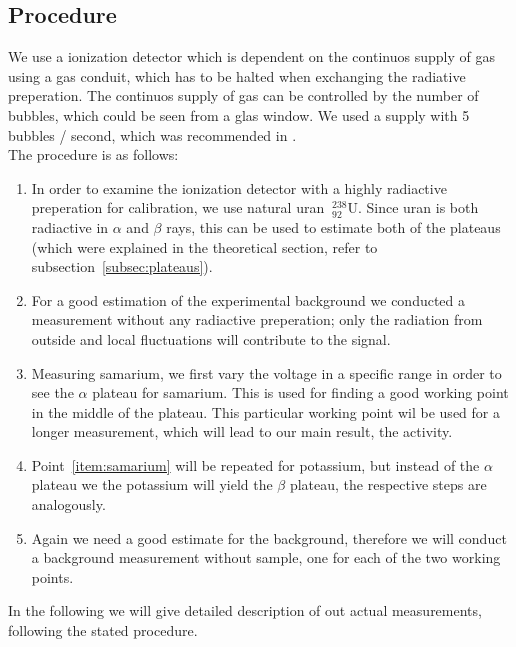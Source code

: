 \subsection{Procedure}
We use a ionization detector which is dependent on the continuos supply of 
gas using a gas conduit, which has to be halted when exchanging the radiative
preperation. The continuos supply of gas can be controlled by the number of
bubbles, which could be seen from a glas window. 
We used a supply with 5 bubbles / second, which was recommended in \cite{ver}.\\
The procedure is as follows:  
\begin{enumerate}
\item In order to examine the ionization detector with a highly radiactive 
preperation for calibration, we use natural uran $\mathrm{~^{238}_{92}U}$.
Since uran is both radiactive in $\alpha$ and $\beta$ rays, this can be used
to estimate both of the plateaus (which were explained in the theoretical section,
refer to subsection~\ref{subsec:plateaus}).
\item For a good estimation of the experimental background we conducted a measurement
without any radiactive preperation; only the radiation from outside and local fluctuations
will contribute to the signal.
\item Measuring samarium, we first vary the voltage in a specific range in order to 
see the $\alpha$ plateau for samarium. This is used for finding a good working point in the middle
of the plateau. This particular working point wil be used for a longer measurement, which will lead to our main result,
the activity. \label{item:samarium}
\item Point~\ref{item:samarium} will be repeated for potassium, but instead of the $\alpha$ plateau
we the potassium will yield the $\beta$ plateau, the respective steps are analogously. 
\item Again we need a good estimate for the background, therefore we will conduct a background measurement
without sample, one for each of the two working points.
\end{enumerate}
In the following we will give detailed description of out actual measurements, following the 
stated procedure. 
